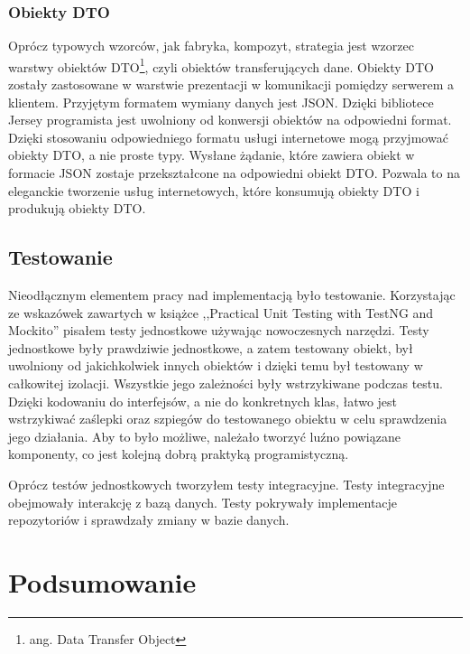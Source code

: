 \documentclass[a4paper,onecolumn,oneside,11pt,wide,floatssmall]{mwrep}
\theoremstyle{definition}
\theoremstyle{plain}%
\theoremstyle{remark}
\begin{document}
\subsection{Obiekty DTO}
Oprócz typowych wzorców, jak fabryka, kompozyt, strategia jest wzorzec warstwy obiektów DTO\footnote{ang. Data Transfer Object}, czyli obiektów transferujących dane. Obiekty DTO zostały zastosowane w warstwie prezentacji w komunikacji pomiędzy serwerem a klientem. Przyjętym formatem wymiany danych jest JSON. Dzięki bibliotece Jersey programista jest uwolniony od konwersji obiektów na odpowiedni format. Dzięki stosowaniu odpowiedniego formatu usługi internetowe mogą przyjmować obiekty DTO, a nie proste typy. Wysłane żądanie, które zawiera obiekt w formacie JSON zostaje przekształcone na odpowiedni obiekt DTO. Pozwala to na eleganckie tworzenie usług internetowych, które konsumują obiekty DTO i produkują obiekty DTO.

\section{Testowanie}
Nieodłącznym elementem pracy nad implementacją było testowanie. Korzystając ze wskazówek zawartych w książce ,,Practical Unit Testing with TestNG and Mockito'' \cite{kaczanowski2012practical} pisałem testy jednostkowe używając nowoczesnych narzędzi. Testy jednostkowe były prawdziwie jednostkowe, a zatem testowany obiekt, był uwolniony od jakichkolwiek innych obiektów i dzięki temu był testowany w całkowitej izolacji. Wszystkie jego zależności były wstrzykiwane podczas testu. Dzięki kodowaniu do interfejsów, a nie do konkretnych klas, łatwo jest wstrzykiwać zaślepki oraz szpiegów do testowanego obiektu w celu sprawdzenia jego działania. Aby to było możliwe, należało tworzyć luźno powiązane komponenty, co jest kolejną dobrą praktyką programistyczną.

Oprócz testów jednostkowych tworzyłem testy integracyjne. Testy integracyjne obejmowały interakcję z bazą danych. Testy pokrywały implementacje repozytoriów i sprawdzały zmiany w bazie danych. 

\chapter{Podsumowanie}
\end{document}
